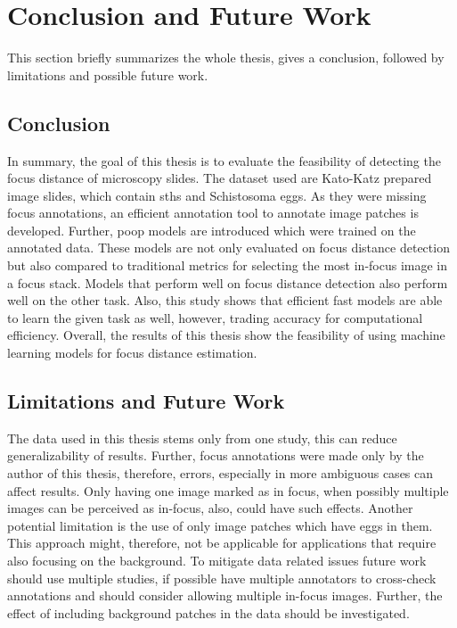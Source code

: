 \chapter{Conclusion and Future Work}
\label{ch:Conclusion}

This section briefly summarizes the whole thesis, gives a conclusion, followed by limitations and possible future work.

\section{Conclusion}
\label{sec:Conclusion:Conclusion}

In summary, the goal of this thesis is to evaluate the feasibility of detecting the focus distance of microscopy slides. The dataset used are Kato-Katz prepared image slides, which contain \aclp{sth} and Schistosoma eggs. As they were missing focus annotations, an efficient annotation tool to annotate image patches is developed. Further, \ac{poop} models are introduced which were trained on the annotated data. These models are not only evaluated on focus distance detection but also compared to traditional metrics for selecting the most in-focus image in a focus stack. Models that perform well on focus distance detection also perform well on the other task. Also, this study shows that efficient fast models are able to learn the given task as well, however, trading accuracy for computational efficiency.
Overall, the results of this thesis show the feasibility of using machine learning models for focus distance estimation.


\section{Limitations and Future Work}
\label{sec:Conclusion:FutureWork}

The data used in this thesis stems only from one study, this can reduce generalizability of results. Further, focus annotations were made only by the author of this thesis, therefore, errors, especially in more ambiguous cases can affect results. Only having one image marked as in focus, when possibly multiple images can be perceived as in-focus, also, could have such effects. Another potential limitation is the use of only image patches which have eggs in them. This approach might, therefore, not be applicable  for applications that require also focusing on the background. 
To mitigate data related issues future work should use multiple studies, if possible have multiple annotators to cross-check annotations and should consider allowing multiple in-focus images. Further, the effect of including background patches in the data should be investigated.

